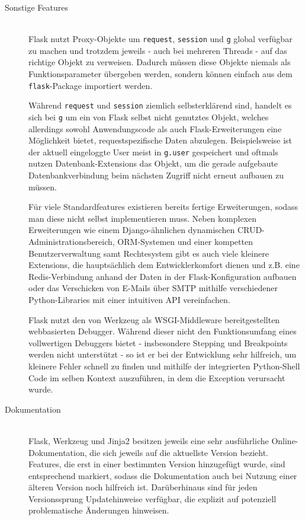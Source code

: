 \begin{description}
\item[Sonstige Features] \hfill \\
Flask nutzt Proxy-Objekte um \lstinline{request}, \lstinline{session} und \lstinline{g} global
verfügbar zu machen und trotzdem jeweils - auch bei mehreren Threads - auf das richtige Objekt zu
verweisen. Dadurch müssen diese Objekte niemals als Funktionsparameter übergeben werden, sondern
können einfach aus dem \lstinline{flask}-Package importiert werden.

Während \lstinline{request} und \lstinline{session} ziemlich selbsterklärend sind, handelt es sich
bei \lstinline{g} um ein von Flask selbst nicht genutztes Objekt, welches allerdings sowohl
Anwendungscode als auch Flask-Erweiterungen eine Möglichkeit bietet, requestspezifische Daten
abzulegen. Beispielsweise ist der aktuell eingeloggte User meist in \lstinline{g.user} gespeichert
und oftmals nutzen Datenbank-Extensions das Objekt, um die gerade aufgebaute Datenbankverbindung
beim nächsten Zugriff nicht erneut aufbauen zu müssen.

Für viele Standardfeatures existieren bereits fertige Erweiterungen, sodass man diese nicht selbst
implementieren muss. Neben komplexen Erweiterungen wie einem Django-ähnlichen dynamischen
CRUD-Administrationsbereich, ORM-Systemen und einer kompetten Benutzerverwaltung samt Rechtesystem
gibt es auch viele kleinere Extensions, die hauptsächlich dem Entwicklerkomfort dienen und z.B. eine
Redis-Verbindung anhand der Daten in der Flask-Konfiguration aufbauen oder das Verschicken von
E-Mails über SMTP mithilfe verschiedener Python-Libraries mit einer intuitiven API vereinfachen.

Flask nutzt den von Werkzeug als WSGI-Middleware bereitgestellten webbasierten Debugger. Während
dieser nicht den Funktionsumfang eines vollwertigen Debuggers bietet - insbesondere Stepping und
Breakpoints werden nicht unterstützt - so ist er bei der Entwicklung sehr hilfreich, um kleinere
Fehler schnell zu finden und mithilfe der integrierten Python-Shell Code im selben Kontext
auszuführen, in dem die Exception verursacht wurde.


\item[Dokumentation] \hfill \\
Flask, Werkzeug und Jinja2 besitzen jeweils eine sehr ausführliche Online-Dokumentation, die sich
jeweils auf die aktuellste Version bezieht. Features, die erst in einer bestimmten Version
hinzugefügt wurde, sind entsprechend markiert, sodass die Dokumentation auch bei Nutzung einer
älteren Version noch hilfreich ist. Darüberhinaus sind für jeden Versionssprung Updatehinweise
verfügbar, die explizit auf potenziell problematische Änderungen hinweisen.


\end{description}
